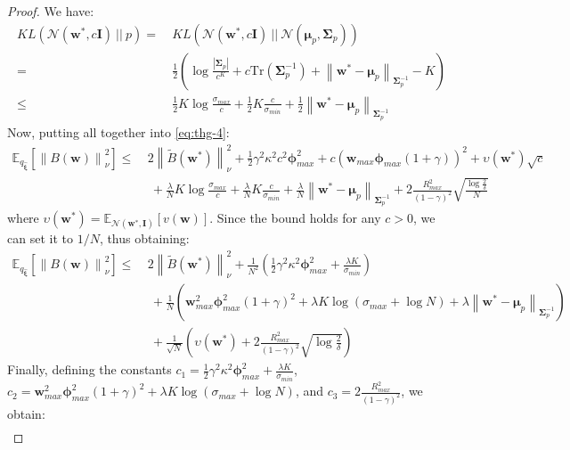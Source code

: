 \documentclass{article}
\newcommand{\wt}[1]{\widetilde{#1}}
\newcommand{\wh}[1]{\widehat{#1}}
\newcommand{\norm}[1]{\left\lVert #1 \right\rVert}
\newcommand{\abs}[1]{\left\lvert #1 \right\rvert}
\begin{document}
\begin{proof}
We have:
\begin{align*}
KL\left(\mathcal{N}(\bm{w}^*,c\bm{I})\ ||\ p\right) =\ & KL\left(\mathcal{N}(\bm{w}^*,c\bm{I})\ ||\ \mathcal{N}(\bm{\mu}_p,\bm{\Sigma}_p)\right)\\ =\ & \frac{1}{2}\left( \log\frac{\abs{\bm{\Sigma}_p}}{c^K} + c\text{Tr}\left( \bm{\Sigma}_p^{-1}\right) + \norm{\bm{w}^* - \bm{\mu}_p}_{\bm{\Sigma}_p^{-1}} -K \right)\\ \leq\ & \frac{1}{2}K\log\frac{\sigma_{max}}{c} + \frac{1}{2}K\frac{c}{\sigma_{min}} + \frac{1}{2}\norm{\bm{w}^* - \bm{\mu}_p}_{\bm{\Sigma}_p^{-1}}
\end{align*}
Now, putting all together into \ref{eq:thg-4}:
\begin{align*}
\mathbb{E}_{q_{\wh{\bm{\xi}}}}\left[ \norm{B(\bm{w})}_{\nu}^2 \right ] \leq\ & 2\norm{\wt{B}(\bm{w}^{*})}_{\nu}^2 + \frac{1}{2}\gamma^2\kappa^2 c^2\bm{\phi}_{max}^2 + c\left(\bm{w}_{max}\bm{\phi}_{max}(1 + \gamma)\right)^2 + \upsilon(\bm{w}^*)\sqrt{c}\\ &\ + \frac{\lambda}{N}K\log\frac{\sigma_{max}}{c} + \frac{\lambda}{N}K\frac{c}{\sigma_{min}} + \frac{\lambda}{N}\norm{\bm{w}^* - \bm{\mu}_p}_{\bm{\Sigma}_p^{-1}} + 2\frac{R_{max}^2}{(1-\gamma)^2}\sqrt{\frac{\log\frac{2}{\delta}}{N}}
\end{align*}
where $\upsilon(\bm{w}^*) = \mathbb{E}_{\mathcal{N}(\bm{w}^*,\bm{I})}\left[ v(\bm{w}) \right]$. Since the bound holds for any $c>0$, we can set it to $1/N$, thus obtaining:
\begin{align*}
\mathbb{E}_{q_{\wh{\bm{\xi}}}}\left[ \norm{B(\bm{w})}_{\nu}^2 \right ] \leq\ & 2\norm{\wt{B}(\bm{w}^{*})}_{\nu}^2 + \frac{1}{N^2}\left(\frac{1}{2}\gamma^2\kappa^2\bm{\phi}_{max}^2 + \frac{\lambda K}{\sigma_{min}}\right)\\ &\ + \frac{1}{N}\left(\bm{w}_{max}^2\bm{\phi}_{max}^2(1 + \gamma)^2 + \lambda K \log(\sigma_{max} + \log N) + \lambda\norm{\bm{w}^* - \bm{\mu}_p}_{\bm{\Sigma}_p^{-1}} \right)\\ &\ + \frac{1}{\sqrt{N}}\left(\upsilon(\bm{w}^*) + 2\frac{R_{max}^2}{(1-\gamma)^2}\sqrt{\log\frac{2}{\delta}}\right)
\end{align*}
Finally, defining the constants $c_1 = \frac{1}{2}\gamma^2\kappa^2\bm{\phi}_{max}^2 + \frac{\lambda K}{\sigma_{min}}$, $c_2 = \bm{w}_{max}^2\bm{\phi}_{max}^2(1 + \gamma)^2 + \lambda K \log(\sigma_{max} + \log N)$, and $c_3 = 2\frac{R_{max}^2}{(1-\gamma)^2}$, we obtain:
\begin{align*}

\end{align*}
\end{proof}
\end{document}
